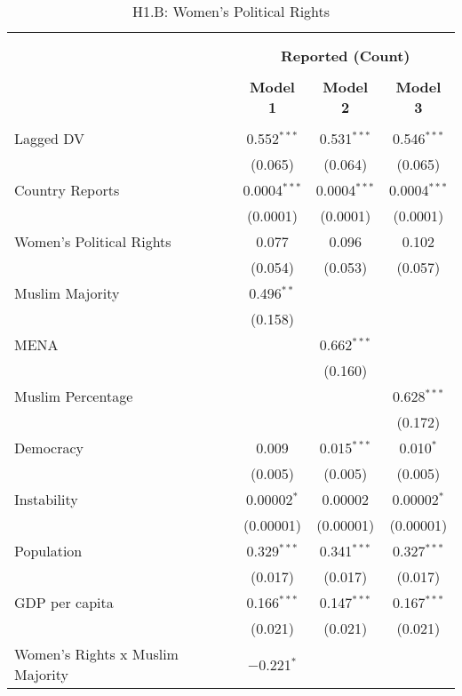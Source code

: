 
\begin{table}[!htbp] \centering 
  \caption{H1.B: Women's Political Rights} 
  \label{} 
\begin{tabular}{@{\extracolsep{5pt}}lccc} 
\\[-1.8ex]\hline \\[-1.8ex] 
\\[-1.8ex] & \multicolumn{3}{c}{\textbf{Reported (Count)}} \\ 
\\[-1.8ex] & \textbf{Model 1} & \textbf{Model 2} & \textbf{Model 3}\\ 
\hline \\[-1.8ex] 
 Lagged DV & 0.552$^{***}$ & 0.531$^{***}$ & 0.546$^{***}$ \\ 
  & (0.065) & (0.064) & (0.065) \\ 
  Country Reports & 0.0004$^{***}$ & 0.0004$^{***}$ & 0.0004$^{***}$ \\ 
  & (0.0001) & (0.0001) & (0.0001) \\ 
  Women's Political Rights & 0.077 & 0.096 & 0.102 \\ 
  & (0.054) & (0.053) & (0.057) \\ 
  Muslim Majority & 0.496$^{**}$ &  &  \\ 
  & (0.158) &  &  \\ 
  MENA &  & 0.662$^{***}$ &  \\ 
  &  & (0.160) &  \\ 
  Muslim Percentage &  &  & 0.628$^{***}$ \\ 
  &  &  & (0.172) \\ 
  Democracy & 0.009 & 0.015$^{***}$ & 0.010$^{*}$ \\ 
  & (0.005) & (0.005) & (0.005) \\ 
  Instability & 0.00002$^{*}$ & 0.00002 & 0.00002$^{*}$ \\ 
  & (0.00001) & (0.00001) & (0.00001) \\ 
  Population & 0.329$^{***}$ & 0.341$^{***}$ & 0.327$^{***}$ \\ 
  & (0.017) & (0.017) & (0.017) \\ 
  GDP per capita & 0.166$^{***}$ & 0.147$^{***}$ & 0.167$^{***}$ \\ 
  & (0.021) & (0.021) & (0.021) \\ 
  Women's Rights x Muslim Majority & $-$0.221$^{*}$ &  &  \\ 

\end{tabular}
\end{table}
